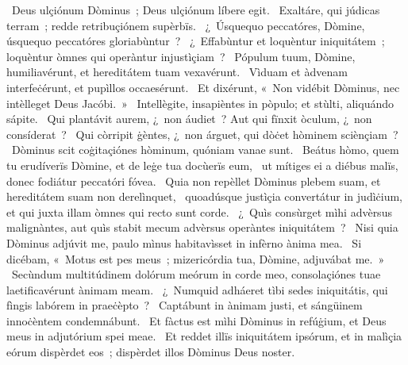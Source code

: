 \psalmChapterWithInscription{}
{ }
{%
~Deus ulçiónum Dòminus~; Deus ulçiónum líbere egit. 
~Exaltáre, qui júdicas terram~; redde retribuçiónem supèrbïs. 
~¿~Úsquequo peccatóres, Dòmine, úsquequo peccatóres gloriabùntur~? 
~¿~Effabùntur et loquèntur iniquitátem~; loquèntur òmnes qui operàntur injustìçiam~? 
~Pópulum tuum, Dòmine, humiliavérunt, et hereditátem tuam vexavérunt. 
~Vìduam et àdvenam interfeċérunt, et pupìllos occaesérunt. 
~Et dixérunt, «~Non vidébit Dòminus, nec intèlleget Deus Jacóbi.~»
~Intellègite, insapièntes in pòpulo; et stùlti, aliquándo sápite. 
~Qui plantávit aurem, ¿~non áudiet~? Aut qui fïnxit òculum, ¿~non consíderat~? 
~Qui còrripit ġèntes, ¿~non árguet, qui dòċet hòminem sciènçiam~? 
~Dòminus scit coġitaçiónes hòminum, quóniam vanae sunt. 
~Beátus hòmo, quem tu erudíverïs Dòmine, et de leġe tua docùerïs eum, 
~ut mítiges ei a diébus malïs, donec fodiátur peccatóri fóvea. 
~Quia non repèllet Dòminus plebem suam, et hereditátem suam non derelìnquet, 
~quoadúsque justìçia convertátur in judìċium, et qui juxta illam òmnes qui recto sunt corde. 
~¿~Quìs consùrget mìhi advèrsus malignàntes, aut quìs stabit mecum advèrsus operàntes iniquitátem~? 
~Nisi quia Dòminus adjúvit me, paulo mìnus habitavìsset in infèrno ànima mea. 
~Si dicébam, «~Motus est pes meus~; mizericórdia tua, Dòmine, adjuvábat me.~»
~Secùndum multitúdinem dolórum meórum in corde meo, consolaçiónes tuae laetificavérunt ànimam meam. 
~¿~Numquid adháeret tìbi sedes iniquitátis, qui fìngis labórem in praeċèpto~? 
~Captábunt in ànimam justi, et sángüinem innoċèntem condemnábunt. 
~Et fàctus est mìhi Dòminus in refúġium, et Deus meus in adjutórium spei meae. 
~Et reddet illïs iniquitátem ipsórum, et in malìçia eórum dispèrdet eos~; dispèrdet illos Dòminus Deus noster. 
}
